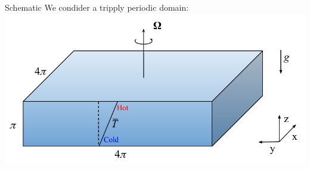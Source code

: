 \documentclass[aspecttatio=169]{beamer}
\begin{document}
\begin{frame}{Schematic}
    We condider a tripply periodic domain: 
    \includegraphics[width = \textwidth]{images/schematic.pdf}

\end{frame}
\end{document}
